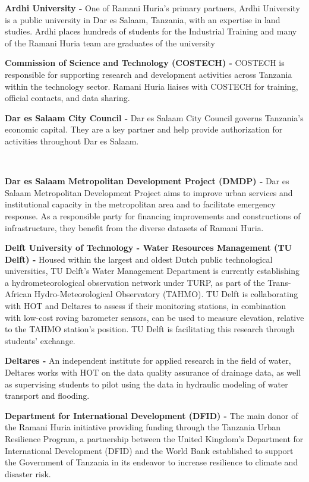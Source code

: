 \documentclass[a4paper,12pt,twoside]{article}
\begin{document}
\begin{multicols}
\medskip
\textbf{Ardhi University -} One of Ramani Huria’s primary partners, Ardhi University is a public university in Dar es Salaam, Tanzania, with an expertise in land studies. Ardhi places hundreds of students for the Industrial Training and many of the Ramani Huria team are graduates of the university

\textbf{Commission of Science and Technology (COSTECH) -} COSTECH is responsible for supporting research and development activities across Tanzania within the technology sector. Ramani Huria liaises with COSTECH for training, official contacts, and data sharing.

\textbf{Dar es Salaam City Council -} Dar es Salaam City Council governs Tanzania’s economic capital. They are a key partner and help provide authorization for activities throughout Dar es Salaam. 

\

\textbf{Dar es Salaam Metropolitan Development Project (DMDP) -} Dar es Salaam Metropolitan Development Project aims to improve urban services and institutional capacity in the metropolitan area and to facilitate emergency response. As a responsible party for financing improvements and constructions of infrastructure, they benefit from the diverse datasets of Ramani Huria. 

\textbf{Delft University of Technology - Water Resources Management (TU Delft) -} Housed within the largest and oldest Dutch public technological universities, TU Delft's Water Management Department is currently establishing a hydrometeorological observation network under TURP, as part of the Trans-African Hydro-Meteorological Observatory (TAHMO). TU Delft is collaborating with HOT and Deltares to assess if their monitoring stations, in combination with low-cost roving barometer sensors, can be used to measure elevation, relative to the TAHMO station's position. TU Delft is facilitating this research through students’ exchange. 

\textbf{Deltares -} An independent institute for applied research in the field of water, Deltares works with HOT on the data quality assurance of drainage data, as well as supervising students to pilot using the data in hydraulic modeling of water transport and flooding. 

\textbf{Department for International Development (DFID) -} The main donor of the Ramani Huria initiative providing funding through the Tanzania Urban Resilience Program, a partnership between the United Kingdom’s Department for International Development (DFID) and the World Bank established to support the Government of Tanzania in its endeavor to increase resilience to climate and disaster risk. 


\end{multicols}
\end{document}
